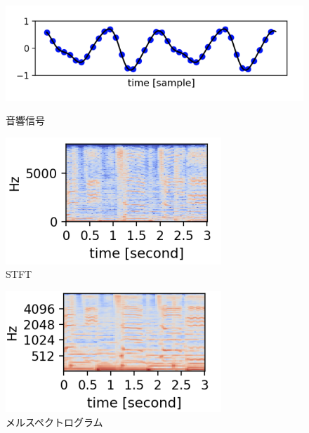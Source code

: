 \begin{figure}[b]
\centering
\begin{minipage}[b]{0.48\columnwidth}
\centering
\includegraphics[width=\columnwidth]{figure/audio_signal.png}
\caption{音響信号}
\label{fig:audio_signal}
\end{minipage}
\begin{minipage}[b]{0.48\columnwidth}
\centering
\includegraphics[width=\columnwidth]{figure/stft.png}
\caption{STFT}
\label{fig:STFT}
\end{minipage}
\end{figure}

\clearpage

\begin{figure}[t]
\centering
\includegraphics[width=0.6\columnwidth]{figure/mel.png}
\caption{メルスペクトログラム}
\label{fig:mel}
\end{figure}

